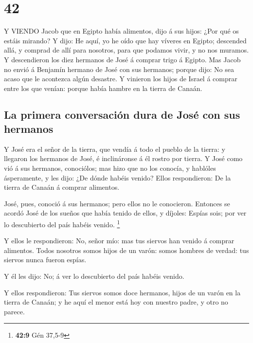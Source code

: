 \hypertarget{section-41}{%
\section{42}\label{section-41}}

 Y VIENDO Jacob que en Egipto había alimentos, dijo á sus
hijos: ¿Por qué os estáis mirando?  Y dijo: He aquí, yo he
oído que hay víveres en Egipto; descended allá, y comprad de allí para
nosotros, para que podamos vivir, y no nos muramos.  Y
descendieron los diez hermanos de José á comprar trigo á Egipto.
 Mas Jacob no envió á Benjamín hermano de José con sus
hermanos; porque dijo: No sea acaso que le acontezca algún desastre.
 Y vinieron los hijos de Israel á comprar entre los que
venían: porque había hambre en la tierra de Canaán.

\hypertarget{la-primera-conversaciuxf3n-dura-de-josuxe9-con-sus-hermanos}{%
\subsection{La primera conversación dura de José con sus
hermanos}\label{la-primera-conversaciuxf3n-dura-de-josuxe9-con-sus-hermanos}}

 Y José era el señor de la tierra, que vendía á todo el
pueblo de la tierra: y llegaron los hermanos de José, é inclináronse á
él rostro por tierra.  Y José como vió á sus hermanos,
conociólos; mas hizo que no los conocía, y hablóles ásperamente, y les
dijo: ¿De dónde habéis venido? Ellos respondieron: De la tierra de
Canaán á comprar alimentos.

 José, pues, conoció á sus hermanos; pero ellos no le
conocieron.  Entonces se acordó José de los sueños que había
tenido de ellos, y díjoles: Espías sois; por ver lo descubierto del país
habéis venido. \footnote{\textbf{42:9} Gén 37,5-9}

 Y ellos le respondieron: No, señor mío: mas tus siervos
han venido á comprar alimentos.  Todos nosotros somos hijos
de un varón: somos hombres de verdad: tus siervos nunca fueron espías.

 Y él les dijo: No; á ver lo descubierto del país habéis
venido.

 Y ellos respondieron: Tus siervos somos doce hermanos,
hijos de un varón en la tierra de Canaán; y he aquí el menor está hoy
con nuestro padre, y otro no parece.

